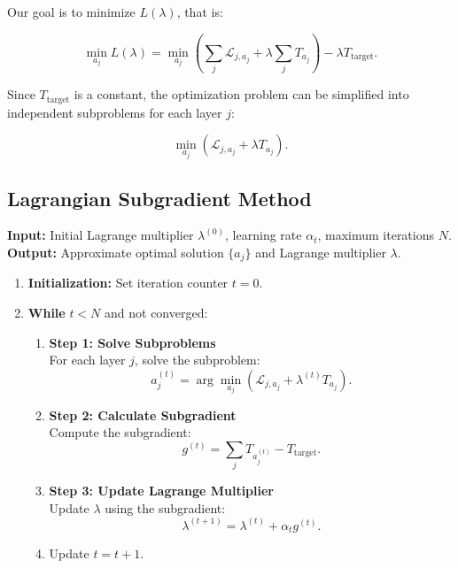 Our goal is to minimize $L(\lambda)$, that is:

\begin{equation}
\min_{a_j} L(\lambda) = \min_{a_j} \left( \sum_j \mathcal{L}_{j,a_j} + \lambda \sum_j T_{a_j} \right) - \lambda T_{\text{target}}.
\end{equation}

Since $T_{\text{target}}$ is a constant, the optimization problem can be simplified into independent subproblems for each layer $j$:

\begin{equation}
\min_{a_j} \left( \mathcal{L}_{j,a_j} + \lambda T_{a_j} \right).
\end{equation}


\subsection{Lagrangian Subgradient Method}

\noindent\textbf{Input:} Initial Lagrange multiplier $\lambda^{(0)}$, learning rate $\alpha_t$, maximum iterations $N$.\\
\textbf{Output:} Approximate optimal solution $\{a_j\}$ and Lagrange multiplier $\lambda$.

\begin{enumerate}
    \item \textbf{Initialization:} Set iteration counter $t = 0$.
    \item \textbf{While} $t < N$ and not converged:
    \begin{enumerate}
        \item \textbf{Step 1: Solve Subproblems} \\
        For each layer $j$, solve the subproblem:
        \begin{equation}
        a_j^{(t)} = \arg\min_{a_j} \left( \mathcal{L}_{j,a_j} + \lambda^{(t)} T_{a_j} \right).
        \end{equation}
        \item \textbf{Step 2: Calculate Subgradient} \\
        Compute the subgradient:
        \begin{equation}
        g^{(t)} = \sum_j T_{a_j^{(t)}} - T_{\text{target}}.
        \end{equation}
        \item \textbf{Step 3: Update Lagrange Multiplier} \\
        Update $\lambda$ using the subgradient:
        \begin{equation}
        \lambda^{(t+1)} = \lambda^{(t)} + \alpha_t g^{(t)}.
        \end{equation}
        \item Update $t = t + 1$.
    \end{enumerate}
\end{enumerate}

